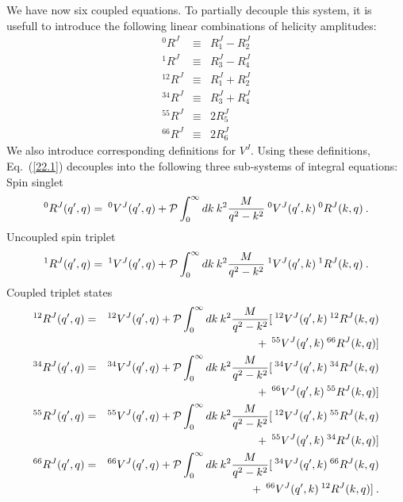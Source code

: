 We have now six coupled equations.
To partially decouple this system, it is usefull to 
introduce the following linear combinations of helicity amplitudes:
\begin{eqnarray}
^0{R}^J&\equiv&{R}^J_1 - {R}^J_2  \nonumber \\
^1{R}^J&\equiv&{R}^J_3 - {R}^J_4  \nonumber \\
^{12}{R}^J&\equiv&{R}^J_1 + {R}^J_2 \label{22.4} \\
^{34}{R}^J&\equiv&{R}^J_3 + {R}^J_4 \nonumber \\
^{55}{R}^J&\equiv&2{R}^J_5 \nonumber \\
^{66}{R}^J&\equiv&2{R}^J_6 \nonumber 
\end{eqnarray}
We also introduce corresponding definitions for ${V}^J$.
Using these definitions, Eq.~(\ref{22.1}) decouples into the following 
three sub-systems of integral equations:\\
{ Spin singlet}
\begin{equation}
^0{R}^J(q',q) =\:  ^0{V}^J(q',q)+{\cal P}\int^{\infty}_0 dk\: k^2
\frac{M}{q^2-k^2}\: ^0{V}^J(q',k)\: ^0{R}^J(k,q)
\: .
\label{22.5} 
\end{equation}
{ Uncoupled spin triplet}
\begin{equation}
^1{R}^J(q',q) =\:  ^1{V}^J(q',q)+{\cal P}\int^{\infty}_0 dk\: k^2
\frac{M}{q^2-k^2}\: ^1{V}^J(q',k)\: ^1{R}^J(k,q)
\: .
\label{22.6} 
\end{equation}
{ Coupled triplet states}
\begin{eqnarray}
^{12}{R}^J(q',q)&=& ^{12}{V}^J(q',q)+{\cal P}\int^{\infty}_0 dk\: k^2
\frac{M}{q^2-k^2}[\: ^{12}{V}^J(q',k)\: ^{12}{R}^J(k,q) \nonumber \\
 & & \mbox{} +\: ^{55}{V}^J(q',k)\: ^{66}{R}^J(k,q)]  \nonumber \\
^{34}{R}^J(q',q)&=& ^{34}{V}^J(q',q)+{\cal P}\int^{\infty}_0 dk\: k^2
\frac{M}{q^2-k^2}[\: ^{34}{V}^J(q',k)\: ^{34}{R}^J(k,q) \nonumber \\
 & & \mbox{} +\: ^{66}{V}^J(q',k)\: ^{55}{R}^J(k,q)]   \nonumber \\
^{55}{R}^J(q',q)&=& ^{55}{V}^J(q',q)+{\cal P}\int^{\infty}_0 dk\: k^2
\frac{M}{q^2-k^2}[\: ^{12}{V}^J(q',k)\: ^{55}{R}^J(k,q) \nonumber \\
 & & \mbox{} +\: ^{55}{V}^J(q',k)\: ^{34}{R}^J(k,q)]  \nonumber \\
^{66}{R}^J(q',q)&=& ^{66}{V}^J(q',q)+{\cal P}\int^{\infty}_0 dk\: k^2
\frac{M}{q^2-k^2}[\: ^{34}{V}^J(q',k)\: ^{66}{R}^J(k,q) \nonumber \\
 & & \mbox{} +\: ^{66}{V}^J(q',k)\: ^{12}{R}^J(k,q)] 
\: .
\label{22.7}
\end{eqnarray}

